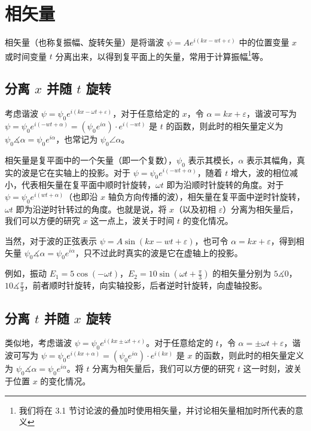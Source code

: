 \documentclass[UTF8]{report}
\theoremstyle{MyLineTheoremStyle} %
\theoremstyle{MyBlockTheoremStyle} %
\theoremstyle{MySubsubsectionStyle} %
\begin{document}
\section{相矢量}\label{相矢量}

相矢量（也称复振幅、旋转矢量）是将谐波 $\psi = A e^{i (kx - wt + \varepsilon)}$ 中的位置变量 $x$ 或时间变量 $t$ 分离出来，以得到复平面上的矢量，常用于计算振幅\footnote{我们将在 3.1 节讨论波的叠加时使用相矢量，并讨论相矢量相加时所代表的意义}等。

\subsection{分离 $x$ 并随 $t$ 旋转}

考虑谐波 $\psi = \psi_0 e^{i(kx - \omega t + \varepsilon)}$，对于任意给定的 $x$，令 $\alpha = kx + \varepsilon$，谐波可写为 $\psi = \psi_0 e^{i(- wt + \alpha)} = (\psi_0 e^{i \alpha})\cdot e^{i(- wt)} $ 是 $t$ 的函数，则此时的相矢量定义为 $ \psi_0 \measuredangle \alpha = \psi_0 e^{i \alpha}$，也常记为 $\psi_0 \angle \alpha$。

相矢量是复平面中的一个矢量（即一个复数），$\psi_0$ 表示其模长，$\alpha$ 表示其幅角，真实的波是它在实轴上的投影。对于 $\psi = \psi_0 e^{i(- wt + \alpha)} $，随着 $t$ 增大，波的相位减小，代表相矢量在复平面中顺时针旋转，$\omega t$ 即为沿顺时针旋转的角度。对于 $\psi = \psi_0 e^{i( wt + \alpha)}$（也即沿 $x$ 轴负方向传播的波），相矢量在复平面中逆时针旋转，$\omega t$ 即为沿逆时针转过的角度。也就是说，将 $x$（以及初相 $\varepsilon$）分离为相矢量后，我们可以方便的研究 $x$ 这一点上，波关于时间 $t$ 的变化情况。

当然，对于波的正弦表示 $\psi = A \sin (kx - wt + \varepsilon)$，也可令  $\alpha = kx + \varepsilon$，得到相矢量 $\psi_0 \measuredangle \alpha = \psi_0 e^{i \alpha}$，只不过此时真实的波是它在虚轴上的投影。

例如，振动 $E_1 = 5 \cos (-\omega t)$，$E_2 = 10 \sin (\omega t + \frac{\pi}{3} )$ 的相矢量分别为 $5 \measuredangle 0$，$10 \measuredangle \frac{\pi}{3} $，前者顺时针旋转，向实轴投影，后者逆时针旋转，向虚轴投影。

\subsection{分离 $t$ 并随 $x$ 旋转}

类似地，考虑谐波 $\psi = \psi_0 e^{i(kx \pm \omega t + \varepsilon)}$。对于任意给定的 $t$，令 $\alpha = \pm \omega t + \varepsilon$，谐波可写为 $\psi = \psi_0 e^{i(kx + \alpha)} = (\psi_0 e^{i \alpha})\cdot e^{i(kx)} $ 是 $x$ 的函数，则此时的相矢量定义为 $ \psi_0 \measuredangle \alpha = \psi_0 e^{i \alpha}$。将 $t$ 分离为相矢量后，我们可以方便的研究 $t$ 这一时刻，波关于位置 $x$ 的变化情况。
\end{document}
